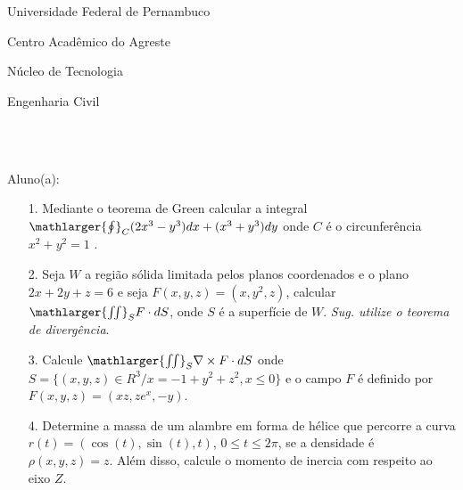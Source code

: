 \documentclass[oneside,a4paper,12pt]{article}
\newcommand{\universidade}{Universidade Federal de Pernambuco}
\newcommand{\centro}{Centro Acadêmico do Agreste}
\newcommand{\departamento}{Núcleo de Tecnologia}
\newcommand{\curso}{Engenharia Civil}
\begin{document}
	\pagestyle{empty}
	
	\begin{center}
	 	\vspace{0pt}
	 	
		\universidade
		\par
		\centro
		\par
		\departamento
		\par
		\curso
		\par
		\vspace{08pt}
		\\ \\
	\end{center}
	
	
	\begin{flushleft}
		Aluno(a):
	\end{flushleft}
 \begin{itemize}	
\item[1.] Mediante o teorema de Green calcular a integral $\mathlarger{\oint}_{C} (2x^{3}-y^{3})dx+(x^{3}+y^{3})dy$ onde $C$ é o circunferência $x^{2}+y^{2}=1$ .
\end{itemize}
\begin{itemize}
\item[2.] Seja $W$ a região sólida limitada pelos planos coordenados e o plano $2x+2y+z=6$ e seja $F(x,y,z)=(x,y^{2},z)$, calcular $\mathlarger{\iint}_{S}F\cdot dS$, onde $S$ é a superfície de $W$. \textit{Sug. utilize o teorema de divergência}. 
\end{itemize}
\begin{itemize}
\item [3.] Calcule $\mathlarger{\iint}_{S} \nabla \times F\cdot dS$ onde $S=\{(x,y,z)\in R^{3}/ x=-1+y^{2}+z^{2}, x\leq 0 \}$ e o campo $F$ é definido por $F(x,y,z)=(xz,ze^{x},-y)$.
\end{itemize}
\begin{itemize}
\item[4.] Determine a massa de um alambre em forma de hélice que percorre a curva $r(t)=(\cos(t),\sin(t),t)$, $0\leq t\leq2\pi$, se a densidade é $\rho(x,y,z)=z$. Além disso, calcule o momento de inercia com respeito ao eixo $Z$.
\end{itemize}
\end{document}
